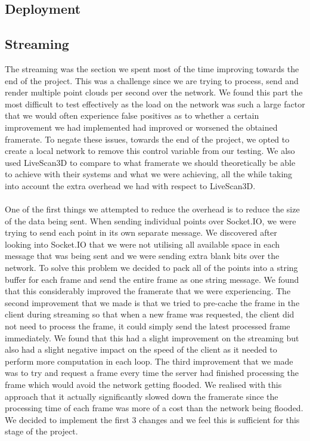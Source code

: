 \documentclass{article}
\begin{document}
\subsection{Deployment} %

\subsection{Streaming}
The streaming was the section we spent most of the time improving towards the end of the project. This was a challenge since we are trying to process, send and render multiple point clouds per second over the network. We found this part the most difficult to test effectively as the load on the network was such a large factor that we would often experience false positives as to whether a certain improvement we had implemented had improved or worsened the obtained framerate. To negate these issues, towards the end of the project, we opted to create a local network to remove this control variable from our testing. We also used LiveScan3D to compare to what framerate we should theoretically be able to achieve with their systems and what we were achieving, all the while taking into account the extra overhead we had with respect to LiveScan3D.
\\\\
One of the first things we attempted to reduce the overhead is to reduce the size of the data being sent. When sending individual points over Socket.IO, we were trying to send each point in its own separate message. We discovered after looking into Socket.IO that we were not utilising all available space in each message that was being sent and we were sending extra blank bits over the network. To solve this problem we decided to pack all of the points into a string buffer for each frame and send the entire frame as one string message. We found that this considerably improved the framerate that we were experiencing. The second improvement that we made is that we tried to pre-cache the frame in the client during streaming so that when a new frame was requested, the client did not need to process the frame, it could simply send the latest processed frame immediately. We found that this had a slight improvement on the streaming but also had a slight negative impact on the speed of the client as it needed to perform more computation in each loop. The third improvement that we made was to try and request a frame every time the server had finished processing the frame which would avoid the network getting flooded. We realised with this approach that it actually significantly slowed down the framerate since the processing time of each frame was more of a cost than the network being flooded. We decided to implement the first 3 changes and we feel this is sufficient for this stage of the project.
\end{document}
